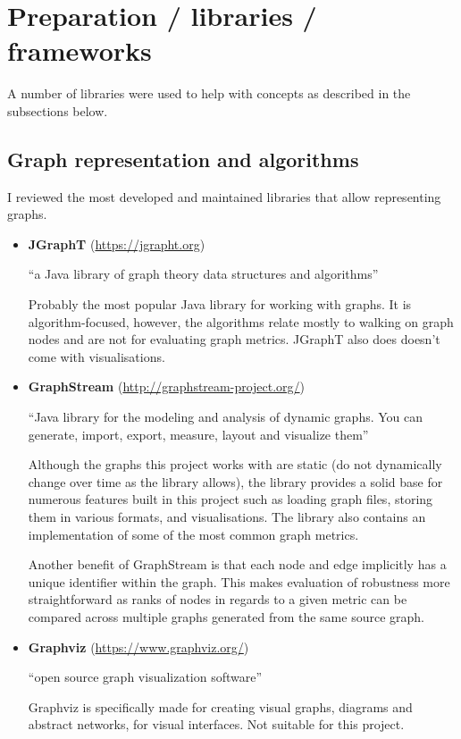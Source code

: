 
\section{Preparation / libraries / frameworks}
    
    A number of libraries were used to help with concepts as described in the subsections below.

    \subsection{Graph representation and algorithms}
    
        I reviewed the most developed and maintained libraries that allow representing graphs.
        
        \begin{itemize}
            \item \textbf{JGraphT} (\url{https://jgrapht.org})
                
                \enquote{a Java library of graph theory data structures and algorithms}
                
                Probably the most popular Java library for working with graphs. It is algorithm-focused, however, the algorithms relate mostly to walking on graph nodes and are not for evaluating graph metrics. JGraphT also does doesn't come with visualisations.
            
            \item \textbf{GraphStream} (\url{http://graphstream-project.org/})
            
                \enquote{Java library for the modeling and analysis of dynamic graphs. You can generate, import, export, measure, layout and visualize them}
                
                Although the graphs this project works with are static (do not dynamically change over time as the library allows), the library provides a solid base for numerous features built in this project such as loading graph files, storing them in various formats, and visualisations. The library also contains an implementation of some of the most common graph metrics.
                
                Another benefit of GraphStream is that each node and edge implicitly has a unique identifier within the graph. This makes evaluation of robustness more straightforward as ranks of nodes in regards to a given metric can be compared across multiple graphs generated from the same source graph.
                
            \item \textbf{Graphviz} (\url{https://www.graphviz.org/})
            
                \enquote{open source graph visualization software}
                
                Graphviz is specifically made for creating visual graphs, diagrams and abstract networks, for visual interfaces. Not suitable for this project.
        \end{itemize}
        
